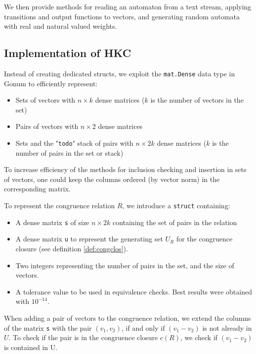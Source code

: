 We then provide methods for reading an automaton from a text stream, applying transitions
and output functions to vectors, and generating random automata with real and natural valued weights.


\subsection{Implementation of HKC}
Instead of creating dedicated structs,
we exploit the \texttt{mat.Dense} data type in Gonum to efficiently represent:
\begin{itemize}
    \item Sets of vectors with $n \times k$ dense matrices ($k$ is the number of vectors in the set)
    \item Pairs of vectors with $n \times 2$ dense matrices
    \item Sets and the "\texttt{todo}" stack of pairs with $n \times 2k$ dense matrices ($k$ is the number of pairs in the set or stack)
\end{itemize}

To increase efficiency of the methods for inclusion checking and insertion in sets of vectors,
one could keep the columns ordered (by vector norm) in the corresponding matrix. 

To represent the congruence relation $R$, we introduce a \texttt{struct} containing:
\begin{itemize}
    \item A dense matrix \texttt{s} of size $n \times 2k$ containing the set of pairs in the relation
    \item A dense matrix \texttt{u} to represent the generating set $U_R$ for the congruence closure (see definition \ref{def:congclos}).
    \item Two integers representing the number of pairs in the set, and the size of vectors.
    \item A tolerance value to be used in equivalence checks. Best results were obtained with $10^{-14}$.
\end{itemize}

When adding a pair of vectors to the congruence relation, we extend the columns
of the matrix \texttt{s} with the pair $(v_1, v_2)$, if and only if $(v_1 - v_2)$ 
is not already in $U$. To check if the pair is in the congruence closure $c(R)$, 
we check if $(v_1 - v_2)$ is contained in U.




